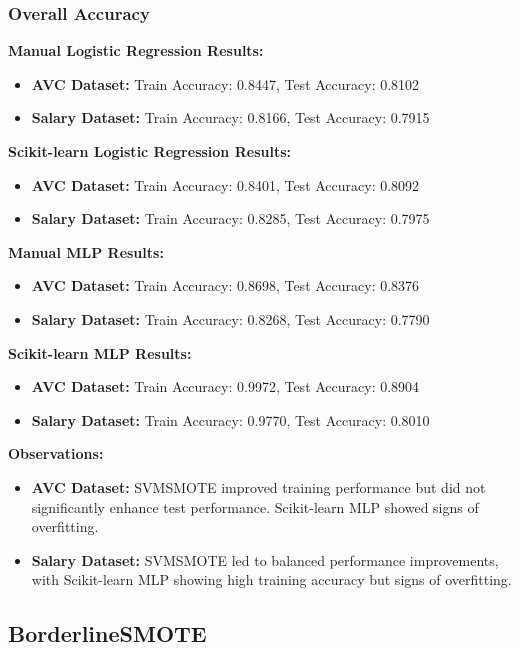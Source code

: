 \documentclass[a4paper,12pt]{article}
\begin{document}
\subsubsection{Overall Accuracy}

\textbf{Manual Logistic Regression Results:}
\begin{itemize}
    \item \textbf{AVC Dataset:} Train Accuracy: 0.8447, Test Accuracy: 0.8102
    \item \textbf{Salary Dataset:} Train Accuracy: 0.8166, Test Accuracy: 0.7915
\end{itemize}

\textbf{Scikit-learn Logistic Regression Results:}
\begin{itemize}
    \item \textbf{AVC Dataset:} Train Accuracy: 0.8401, Test Accuracy: 0.8092
    \item \textbf{Salary Dataset:} Train Accuracy: 0.8285, Test Accuracy: 0.7975
\end{itemize}

\textbf{Manual MLP Results:}
\begin{itemize}
    \item \textbf{AVC Dataset:} Train Accuracy: 0.8698, Test Accuracy: 0.8376
    \item \textbf{Salary Dataset:} Train Accuracy: 0.8268, Test Accuracy: 0.7790
\end{itemize}

\textbf{Scikit-learn MLP Results:}
\begin{itemize}
    \item \textbf{AVC Dataset:} Train Accuracy: 0.9972, Test Accuracy: 0.8904
    \item \textbf{Salary Dataset:} Train Accuracy: 0.9770, Test Accuracy: 0.8010
\end{itemize}

\textbf{Observations:}
\begin{itemize}
    \item \textbf{AVC Dataset:} SVMSMOTE improved training performance but did not significantly enhance test performance. Scikit-learn MLP showed signs of overfitting.
    \item \textbf{Salary Dataset:} SVMSMOTE led to balanced performance improvements, with Scikit-learn MLP showing high training accuracy but signs of overfitting.
\end{itemize}

\subsection{BorderlineSMOTE}
\end{document}
